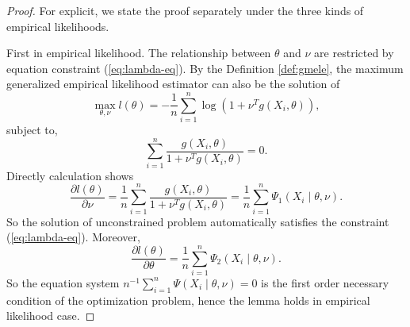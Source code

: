 \begin{proof}
For explicit, we state the proof separately under the three kinds
of empirical likelihoods. 

First in empirical likelihood. The relationship between $\theta$
and $\nu$ are restricted by equation constraint (\ref{eq:lambda-eq}).
By the Definition \ref{def:gmele}, the maximum generalized empirical
likelihood estimator can also be the solution of 
\[
\max_{\theta,\nu}l\left(\theta\right)=-\frac{1}{n}\sum_{i=1}^{n}\log\left(1+\nu^{T}g\left(X_{i},\theta\right)\right),
\]
subject to, 
\[
\sum_{i=1}^{n}\frac{g\left(X_{i},\theta\right)}{1+\nu^{T}g\left(X_{i},\theta\right)}=0.
\]
Directly calculation shows 
\[
\frac{\partial l\left(\theta\right)}{\partial\nu}=\frac{1}{n}\sum_{i=1}^{n}\frac{g\left(X_{i},\theta\right)}{1+\nu^{T}g\left(X_{i},\theta\right)}=\frac{1}{n}\sum_{i=1}^{n}\Psi_{1}\left(X_{i}\mid\theta,\nu\right).
\]
So the solution of unconstrained problem automatically satisfies the
constraint (\ref{eq:lambda-eq}). Moreover, 
\[
\frac{\partial l\left(\theta\right)}{\partial\theta}=\frac{1}{n}\sum_{i=1}^{n}\Psi_{2}\left(X_{i}\mid\theta,\nu\right).
\]
So the equation system $n^{-1}\sum_{i=1}^{n}\Psi\left(X_{i}\mid\theta,\nu\right)=0$
is the first order necessary condition of the optimization problem,
hence the lemma holds in empirical likelihood case.


\end{proof}
